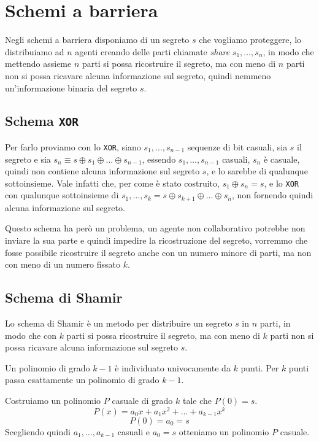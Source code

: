 \section{Schemi a barriera}
Negli schemi a barriera disponiamo di un segreto $s$ che vogliamo proteggere, lo distribuiamo 
ad $n$ agenti creando delle parti chiamate \textit{share} $s_1,\dots,s_n$, in modo che 
mettendo assieme $n$ parti si possa ricostruire il segreto, ma con meno di $n$ parti non si possa 
ricavare alcuna informazione sul segreto, quindi nemmeno un'informazione binaria del segreto $s$.
\subsection{Schema \texttt{XOR}}
Per farlo proviamo con lo \texttt{XOR}, siano $s_1,\dots,s_{n - 1}$ sequenze di bit casuali, 
sia $s$ il segreto e sia 
$s_n \equiv s \oplus s_1 \oplus \dots \oplus s_{n-1}$,
essendo $s_1,\dots,s_{n - 1}$ casuali, $s_n$ è casuale,
quindi non contiene alcuna informazione sul segreto $s$, e lo sarebbe di qualunque sottoinsieme.
Vale infatti che, per come è stato costruito, $s_1 \oplus s_n = s$, e lo \texttt{XOR} con qualunque 
sottoinsieme di $s_1,\dots,s_k = s \oplus s_{k+1} \oplus \dots \oplus s_n$, non fornendo quindi 
alcuna informazione sul segreto.

Questo schema ha però un problema, un agente non collaborativo potrebbe non inviare la sua parte
e quindi impedire la ricostruzione del segreto, vorremmo che fosse possibile ricostruire il segreto
anche con un numero minore di parti, ma non con meno di un numero fissato $k$.

\subsection{Schema di Shamir}
Lo schema di Shamir è un metodo per distribuire un segreto $s$ in $n$ parti, in modo che con $k$
parti si possa ricostruire il segreto, ma con meno di $k$ parti non si possa ricavare alcuna
informazione sul segreto $s$.

\begin{theorem}
  Un polinomio di grado $k - 1$ è individuato univocamente da $k$ punti. Per $k$ punti passa
  esattamente un polinomio di grado $k - 1$.
\end{theorem}

Costruiamo un polinomio $P$ casuale di grado $k$ tale che $P(0) = s$.
\[
  P(x) = a_0x + a_1x^2 + \dots + a_{k-1}x^k
\]
\[
  P(0) = a_0 = s
\]
Scegliendo quindi $a_1, \dots, a_{k-1}$ casuali e $a_0 = s$ otteniamo un polinomio $P$ casuale.

